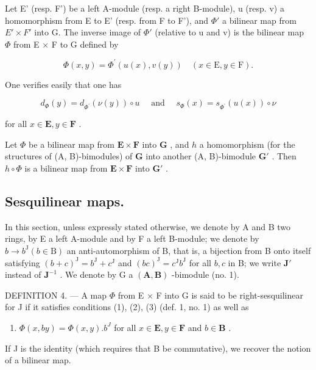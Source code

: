 Let E' (resp. F') be a left A-module (resp. a right B-module), u (resp. v) a homomorphism from E to E' (resp. from F to F'), and \(\Phi'\) a bilinear map from \(E' \times F'\) into G. The inverse image of \(\Phi'\) (relative to u and v) is the bilinear map \(\Phi\) from E × F to G defined by

\[
\Phi (x, y) = \Phi^ {\prime} (u (x), v (y)) \quad (x \in \mathrm{E}, y \in \mathrm{F}).
\]

One verifies easily that one has

\[
d _ {\Phi} (y) = d _ {\Phi^ {\prime}} (\nu (y)) \circ u \quad \text { and } \quad s _ {\Phi} (x) = s _ {\Phi^ {\prime}} (u (x)) \circ \nu
\]

for all \(x \in \mathbf{E}, y \in \mathbf{F}\) .

Let \(\Phi\) be a bilinear map from \(\mathbf{E} \times \mathbf{F}\) into \(\mathbf{G}\) , and \(h\) a homomorphism (for the structures of (A, B)-bimodules) of \(\mathbf{G}\) into another (A, B)-bimodule \(\mathbf{G}'\) . Then \(h \circ \Phi\) is a bilinear map from \(\mathbf{E} \times \mathbf{F}\) into \(\mathbf{G}'\) .

\subsection{Sesquilinear maps.}

In this section, unless expressly stated otherwise, we denote by A and B two rings, by E a left A-module and by F a left B-module; we denote by \(b \to b^{\mathrm{J}} (b \in \mathrm{B})\) an anti-automorphism of B, that is, a bijection from B onto itself satisfying \((b + c)^{\mathrm{J}} = b^{\mathrm{J}} + c^{\mathrm{J}}\) and \((bc)^{\mathrm{J}} = c^{\mathrm{J}}b^{\mathrm{J}}\) for all \(b, c\) in B; we write \(\mathbf{J}'\) instead of \(\mathbf{J}^{-1}\) . We denote by G a \((\mathbf{A}, \mathbf{B})\) -bimodule (no. 1).

DEFINITION 4. --- A map \(\Phi\) from E \(\times\) F into G is said to be right-sesquilinear for J if it satisfies conditions (1), (2), (3) (def. 1, no. 1) as well as

\begin{enumerate}
\def\labelenumi{(\arabic{enumi})}
\setcounter{enumi}{6}
\tightlist
\item
  \(\Phi(x, by) = \Phi(x, y). b^J\) for all \(x \in \mathbf{E}, y \in \mathbf{F}\) and \(b \in \mathbf{B}\) .
\end{enumerate}

If J is the identity (which requires that B be commutative), we recover the notion of a bilinear map.


